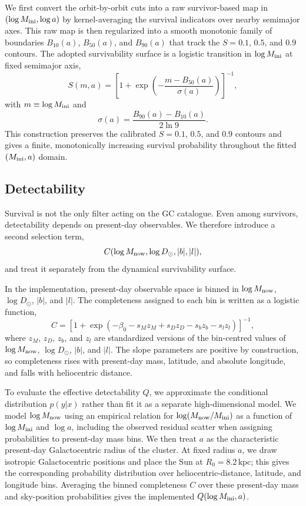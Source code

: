 \documentclass[fleqn,usenatbib]{mnras}
\begin{document}
We first convert the orbit-by-orbit cuts into a raw survivor-based map in $(\log M_{\rm ini}, \log a)$ by kernel-averaging the survival indicators over nearby semimajor axes. This raw map is then regularized into a smooth monotonic family of boundaries $B_{10}(a)$, $B_{50}(a)$, and $B_{90}(a)$ that track the $S=0.1$, $0.5$, and $0.9$ contours. The adopted survivability surface is a logistic transition in $\log M_{\rm ini}$ at fixed semimajor axis,
\begin{equation}
S(m,a)=\left[1+\exp\left(-\frac{m-B_{50}(a)}{\sigma(a)}\right)\right]^{-1},
\end{equation}
with $m\equiv\log M_{\rm ini}$ and
\begin{equation}
\sigma(a)=\frac{B_{90}(a)-B_{10}(a)}{2\ln 9}.
\end{equation}
This construction preserves the calibrated $S=0.1$, $0.5$, and $0.9$ contours and gives a finite, monotonically increasing survival probability throughout the fitted $(M_{\rm ini},a)$ domain.

\subsection{Detectability}\label{sec:detectability}
Survival is not the only filter acting on the GC catalogue. Even among survivors, detectability depends on present-day observables. We therefore introduce a second selection term,
\begin{equation}
C(\log M_{\rm now}, \log D_\odot, |b|, |l|),
\end{equation}
and treat it separately from the dynamical survivability surface.

In the implementation, present-day observable space is binned in $\log M_{\rm now}$, $\log D_\odot$, $|b|$, and $|l|$. The completeness assigned to each bin is written as a logistic function,
\begin{equation}
C = \left[1 + \exp\left(-\beta_0 - s_M z_M + s_D z_D - s_b z_b - s_l z_l\right)\right]^{-1},
\end{equation}
where $z_M$, $z_D$, $z_b$, and $z_l$ are standardized versions of the bin-centred values of $\log M_{\rm now}$, $\log D_\odot$, $|b|$, and $|l|$. The slope parameters are positive by construction, so completeness rises with present-day mass, latitude, and absolute longitude, and falls with heliocentric distance.

To evaluate the effective detectability $Q$, we approximate the conditional distribution $p(y|x)$ rather than fit it as a separate high-dimensional model. We model $\log M_{\rm now}$ using an empirical relation for $\log(M_{\rm now}/M_{\rm ini})$ as a function of $\log M_{\rm ini}$ and $\log a$, including the observed residual scatter when assigning probabilities to present-day mass bins. We then treat $a$ as the characteristic present-day Galactocentric radius of the cluster. At fixed radius $a$, we draw isotropic Galactocentric positions and place the Sun at $R_0=8.2\,\mathrm{kpc}$; this gives the corresponding probability distribution over heliocentric-distance, latitude, and longitude bins. Averaging the binned completeness $C$ over these present-day mass and sky-position probabilities gives the implemented $Q(\log M_{\rm ini},a)$.
\end{document}
